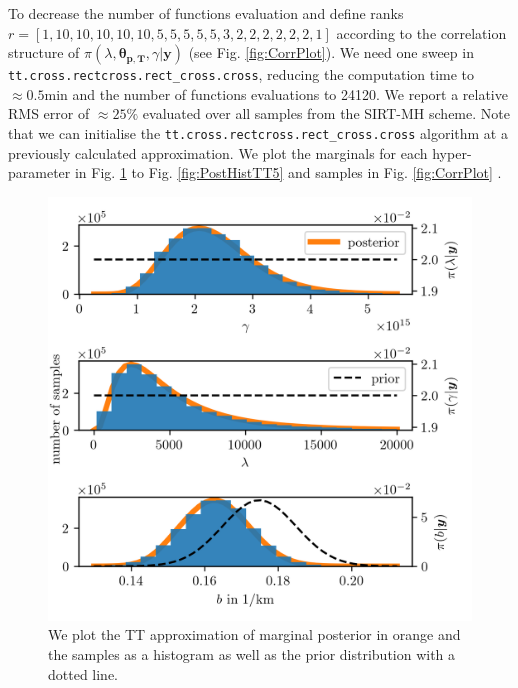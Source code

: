 To decrease the number of functions evaluation and define ranks \linebreak$r = [ 1,  10,  10, 10, 10, 10, 5, 5, 5, 5, 5, 3, 2, 2, 2, 2, 2, 2, 1]$ according to the correlation structure of $\pi( \lambda,\bm{\theta}_{\bm{p}, \bm{T}},\gamma  | \bm{y})$ (see Fig. \ref{fig:CorrPlot}).
We need one sweep in \linebreak\texttt{tt.cross.rectcross.rect\_cross.cross}, reducing the computation time to $\approx0.5$min and the number of functions evaluations to 24120.
We report a relative RMS error of $\approx 25 \%$ evaluated over all samples from the SIRT-MH scheme.
Note that we can initialise the \texttt{tt.cross.rectcross.rect\_cross.cross} algorithm at a previously calculated approximation.
We plot the marginals for each hyper-parameter in Fig. \ref{fig:PostHistTT0} to Fig. \ref{fig:PostHistTT5} and samples in Fig. \ref{fig:CorrPlot} .
\begin{figure}[ht!]
	\centering
	\includegraphics{PHdPTPost0.png}
	\caption[Histograms and TT approximation of posterior distribution as well as hyper-prior distribution.]{We plot the TT approximation of marginal posterior in orange and the samples as a histogram as well as the prior distribution with a dotted line.}
	\label{fig:PostHistTT0}
\end{figure}
